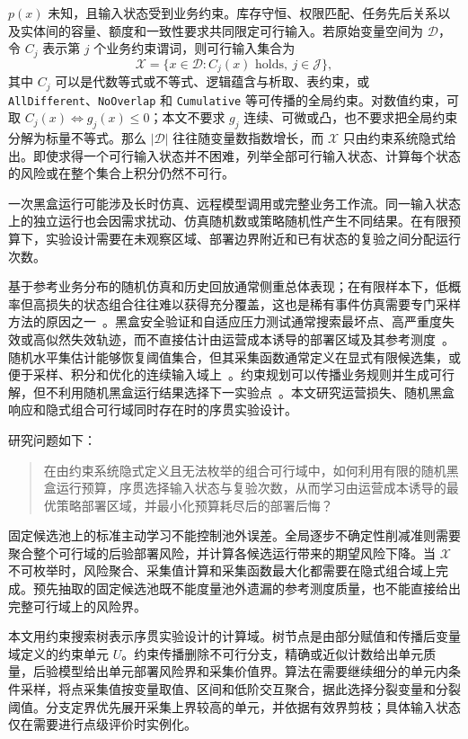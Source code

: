 \documentclass[UTF8,11pt,a4paper,fontset=none]{ctexart}
\newcommand{\X}{\mathcal X}
\newcommand{\D}{\mathcal D}
\newcommand{\1}{\mathbf 1}
\begin{document}
$p(x)$ 未知，且输入状态受到业务约束。库存守恒、权限匹配、任务先后关系以及实体间的容量、额度和一致性要求共同限定可行输入。若原始变量空间为 $\D$，令 $C_j$ 表示第 $j$ 个业务约束谓词，则可行输入集合为
\begin{equation}
  \X=\{x\in\D:C_j(x)\text{ holds},\ j\in\mathcal J\},
  \label{eq:feasible-set}
\end{equation}
其中 $C_j$ 可以是代数等式或不等式、逻辑蕴含与析取、表约束，或 \texttt{AllDifferent}、\texttt{NoOverlap} 和 \texttt{Cumulative} 等可传播的全局约束。对数值约束，可取 $C_j(x)\Longleftrightarrow g_j(x)\leq0$；本文不要求 $g_j$ 连续、可微或凸，也不要求把全局约束分解为标量不等式。那么 $|\D|$ 往往随变量数指数增长，而 $\X$ 只由约束系统隐式给出。即使求得一个可行输入状态并不困难，列举全部可行输入状态、计算每个状态的风险或在整个集合上积分仍然不可行。

一次黑盒运行可能涉及长时仿真、远程模型调用或完整业务工作流。同一输入状态上的独立运行也会因需求扰动、仿真随机数或策略随机性产生不同结果。在有限预算下，实验设计需要在未观察区域、部署边界附近和已有状态的复验之间分配运行次数。

基于参考业务分布的随机仿真和历史回放通常侧重总体表现；在有限样本下，低概率但高损失的状态组合往往难以获得充分覆盖，这也是稀有事件仿真需要专门采样方法的原因之一~\cite{au2001}。黑盒安全验证和自适应压力测试通常搜索最坏点、高严重度失效或高似然失效轨迹，而不直接估计由运营成本诱导的部署区域及其参考测度~\cite{corso2021,lee2020}。随机水平集估计能够恢复阈值集合，但其采集函数通常定义在显式有限候选集，或便于采样、积分和优化的连续输入域上~\cite{gotovos2013,bect2012,chevalier2014,lyu2021}。约束规划可以传播业务规则并生成可行解，但不利用随机黑盒运行结果选择下一实验点~\cite{rossi2006}。本文研究运营损失、随机黑盒响应和隐式组合可行域同时存在时的序贯实验设计。

研究问题如下：

\begin{quote}
在由约束系统隐式定义且无法枚举的组合可行域中，如何利用有限的随机黑盒运行预算，序贯选择输入状态与复验次数，从而学习由运营成本诱导的最优策略部署区域，并最小化预算耗尽后的部署后悔？
\end{quote}

固定候选池上的标准主动学习不能控制池外误差。全局逐步不确定性削减准则需要聚合整个可行域的后验部署风险，并计算各候选运行带来的期望风险下降。当 $\X$ 不可枚举时，风险聚合、采集值计算和采集函数最大化都需要在隐式组合域上完成。预先抽取的固定候选池既不能度量池外遗漏的参考测度质量，也不能直接给出完整可行域上的风险界。

本文用约束搜索树表示序贯实验设计的计算域。树节点是由部分赋值和传播后变量域定义的约束单元 $U$。约束传播删除不可行分支，精确或近似计数给出单元质量，后验模型给出单元部署风险界和采集价值界。算法在需要继续细分的单元内条件采样，将点采集值按变量取值、区间和低阶交互聚合，据此选择分裂变量和分裂阈值。分支定界优先展开采集上界较高的单元，并依据有效界剪枝；具体输入状态仅在需要进行点级评价时实例化。
\end{document}
